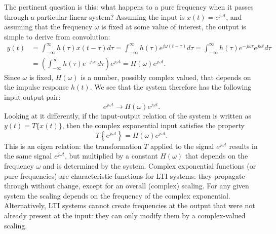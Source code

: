 \documentclass[10pt]{beamer}
\begin{document}
The pertinent question is this:  what happens to a pure frequency when it passes through a particular linear system?  Assuming the input is $x(t) = e^{j \omega t}$, and assuming that the frequency $\omega$ is fixed at some value of interest, the output is simple to derive from convolution:
\begin{align*}
  y(t) &= \int_{-\infty}^{\infty} h(\tau) x(t-\tau) d\tau = \int_{-\infty}^{\infty} h(\tau) e^{j \omega (t-\tau)} d\tau
  = \int_{-\infty}^{\infty} h(\tau) e^{-j \omega \tau} e^{j \omega t} d\tau \\
  &= \left( \int_{-\infty}^{\infty} h(\tau) e^{-j \omega \tau} d\tau \right) e^{j \omega t} 
  = H(\omega) e^{j \omega t}.
\end{align*}
Since $\omega$ is fixed, $H(\omega)$ is a number, possibly complex valued, that depends on the impulse response $h(t)$.  We see that the system therefore has the following input-output pair:
\begin{equation*}
  e^{j \omega t} \longrightarrow H(\omega) e^{j \omega t}.
\end{equation*}
Looking at it differently, if the input-output relation of the system is written as $y(t) = T\{x(t)\}$, then the complex exponential input satisfies the property
\begin{equation*}
  T \left\{ e^{j \omega t} \right\} = H(\omega) e^{j \omega t}.
\end{equation*}
This is an eigen relation:  the transformation $T$ applied to the signal $e^{j \omega t}$ results in the same signal $e^{j \omega t}$, but multiplied by a constant $H(\omega)$ that depends on the frequency $\omega$ and is determined by the system.  Complex exponential functions (or pure frequencies) are characteristic functions for LTI systems:  they propagate through without change, except for an overall (complex) scaling.  For any given system the scaling depends on the frequency of the complex exponential.  Alternatively, LTI systems cannot create frequencies at the output that were not already present at the input:  they can only modify them by a complex-valued scaling.

\begin{center}
\end{center}
\end{document}
